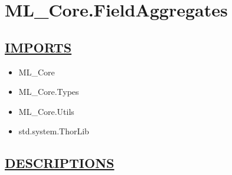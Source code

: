 \chapter*{ML\_Core.FieldAggregates}
\hypertarget{ecldoc:toc:ML_Core.FieldAggregates}{}

\section*{\underline{IMPORTS}}
\begin{itemize}
\item ML\_Core
\item ML\_Core.Types
\item ML\_Core.Utils
\item std.system.ThorLib
\end{itemize}

\section*{\underline{DESCRIPTIONS}}
